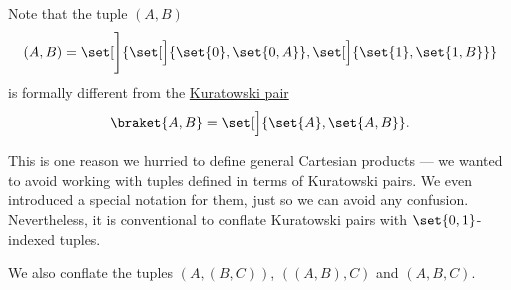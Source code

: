 \begin{remark}\label{rem:kuratowski_pairs_and_tuples}
  Note that the tuple \( (A, B) \)
  \begin{equation*}
    (A, B) = \set[\Bigg]{ \set[\Big]{ \set{ 0 }, \set{ 0, A } }, \set[\Big]{ \set{ 1 }, \set{ 1, B } } }
  \end{equation*}
  is formally different from the \hyperref[def:tuple_and_cartesian_product/kuratowski_pair]{Kuratowski pair}
  \begin{equation*}
    \braket{ A, B } = \set[\Big]{ \set{ A }, \set{ A, B } }.
  \end{equation*}

  This is one reason we hurried to define general Cartesian products --- we wanted to avoid working with tuples defined in terms of Kuratowski pairs. We even introduced a special notation for them, just so we can avoid any confusion. Nevertheless, it is conventional to conflate Kuratowski pairs with \( \set{ 0, 1 } \)-indexed tuples.

  We also conflate the tuples \( (A, (B, C)) \), \( ((A, B), C) \) and \( (A, B, C) \).
\end{remark}

